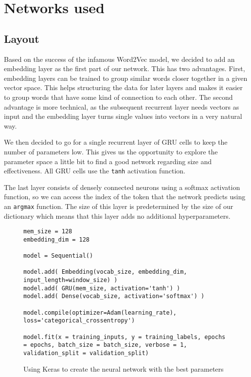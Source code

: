 \section{Networks used}
\label{sec:networks_used}

  \subsection{Layout}
  \label{sub:layout}

    Based on the success of the infamous
    Word2Vec model, we decided to add an embedding layer as the first part of our network. This has two advantages.
    First, embedding layers can be trained to group similar words closer together in a given vector space. This
    helps structuring the data for later layers and makes it easier to group words that have some kind of connection
    to each other. The second advantage is more technical, as the subsequent recurrent layer needs vectors as input
    and the embedding layer turns single values into vectors in a very natural way.

    We then decided to go for a single recurrent layer of GRU cells to keep the number of parameters
    low. This gives us the opportunity to explore the parameter space a little bit to find a good network
    regarding size and effectiveness. All GRU cells use the \verb+tanh+ activation function.

    The last layer consists of densely connected neurons using a softmax activation function, so we can access
    the index of the token that the network predicts using an \verb+argmax+ function. The size of this layer
    is predetermined by the size of our dictionary which means that this layer adds no additional hyperparameters.

    \begin{figure}
    \begin{center}
    \begin{lstlisting}
mem_size = 128
embedding_dim = 128

model = Sequential()

model.add( Embedding(vocab_size, embedding_dim, input_length=window_size) )
model.add( GRU(mem_size, activation='tanh') )
model.add( Dense(vocab_size, activation='softmax') )

model.compile(optimizer=Adam(learning_rate), loss='categorical_crossentropy')

model.fit(x = training_inputs, y = training_labels, epochs = epochs, batch_size = batch_size, verbose = 1, validation_split = validation_split) \end{lstlisting}
    \end{center}
    \caption{Using Keras to create the neural network with the best parameters}
    \label{fig:kerasnet}
    \end{figure}

